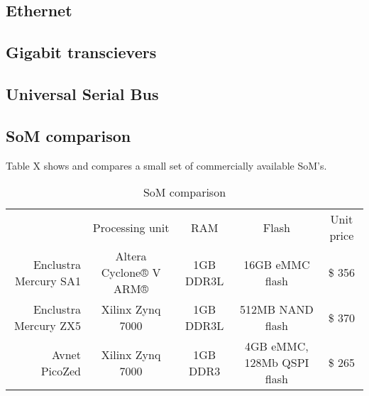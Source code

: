 \subsection{Ethernet}

\subsection{Gigabit transcievers}

\subsection{Universal Serial Bus}

\subsection{SoM comparison}

Table X shows and compares a small set of commercially available SoM's.

\begin{table}[h!]
  \centering
  \begin{tabular}{ r | c c c c }
                          & Processing unit        & RAM       & Flash                      & Unit price \\ 
    Enclustra Mercury SA1 & Altera Cyclone® V ARM® & 1GB DDR3L & 16GB eMMC flash            & \$ 356     \\  
    Enclustra Mercury ZX5 & Xilinx Zynq 7000       & 1GB DDR3L & 512MB NAND flash           & \$ 370     \\
    Avnet PicoZed         & Xilinx Zynq 7000       & 1GB DDR3  & 4GB eMMC, 128Mb QSPI flash & \$ 265     \\  
  \end{tabular}
  \caption{SoM comparison}
  \label{tab:som_comparison}
\end{table}


  


